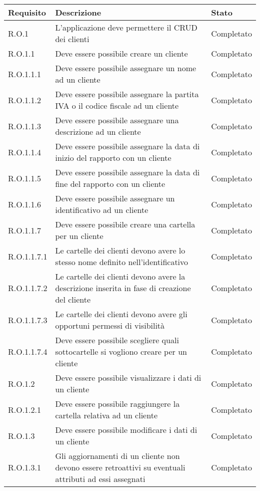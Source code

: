 \begin{longtable}{p{} p{} p{}}
\hline\hline
\textbf{Requisito} & \textbf{Descrizione} & \textbf{Stato}\\
\hline
\hline
R.O.1    & L'applicazione deve permettere il CRUD dei clienti & Completato \\
\hline
R.O.1.1  & Deve essere possibile creare un cliente & Completato \\
\hline
R.O.1.1.1  & Deve essere possibile assegnare un nome ad un cliente & Completato \\
\hline
R.O.1.1.2  & Deve essere possibile assegnare la partita IVA o il codice fiscale ad un cliente & Completato \\
\hline
R.O.1.1.3  & Deve essere possibile assegnare una descrizione ad un cliente & Completato \\
\hline
R.O.1.1.4  & Deve essere possibile assegnare la data di inizio del rapporto con un cliente & Completato \\
\hline
R.O.1.1.5  & Deve essere possibile assegnare la data di fine del rapporto con un cliente & Completato \\
\hline
R.O.1.1.6  & Deve essere possibile assegnare un identificativo ad un cliente & Completato \\
\hline
R.O.1.1.7  & Deve essere possibile creare una cartella per un cliente & Completato \\
\hline
R.O.1.1.7.1  & Le cartelle dei clienti devono avere lo stesso nome definito nell'identificativo & Completato \\
\hline
R.O.1.1.7.2  & Le cartelle dei clienti devono avere la descrizione inserita in fase di creazione del cliente & Completato \\
\hline
R.O.1.1.7.3  & Le cartelle dei clienti devono avere gli opportuni permessi di visibilità & Completato \\
\hline
R.O.1.1.7.4  & Deve essere possibile scegliere quali sottocartelle si vogliono creare per un cliente & Completato \\
\hline
R.O.1.2  & Deve essere possibile visualizzare i dati di un cliente & Completato \\
\hline
R.O.1.2.1  & Deve essere possibile raggiungere la cartella relativa ad un cliente & Completato \\
\hline
R.O.1.3  & Deve essere possibile modificare i dati di un cliente & Completato \\
\hline
R.O.1.3.1  & Gli aggiornamenti di un cliente non devono essere retroattivi su eventuali attributi ad essi assegnati & Completato \\

\end{longtable}
